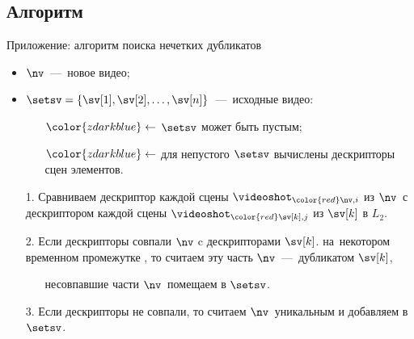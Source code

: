 
\subsection{Алгоритм}

\begin{frame}{Приложение: алгоритм поиска нечетких дубликатов}
    \begin{itemize} \footnotesize
        \item $\nv$\ ---~новое видео;
        \item $\setsv = \{\sv[1], \sv[2], \dots, \sv[n]\}$\ ---~исходные видео:
            \begin{itemize}
                \item[${\color{zdarkblue}\leftarrow}$]
                    {\scriptsize  $\setsv$ может быть пустым};
                \item[${\color{zdarkblue}\leftarrow}$]
                    {\scriptsize для непустого $\setsv$
                        вычислены дескрипторы сцен элементов.}
            \end{itemize}
        \item[1.] Сравниваем дескриптор каждой
            сцены $\videoshot_{\color{red}\nv,i}$ из $\nv$\
            с дескриптором каждой сцены
            $\videoshot_{\color{red}\sv[k],j}$ из $\sv[k]$ в $L_2$.
        \item[2.] Если дескрипторы совпали $\nv$ c дескрипторами $\sv[k]$.
            на~некотором временном промежутке ,
            то считаем эту часть $\nv$\ ---~дубликатом $\sv[k]$,
            \begin{itemize}
                \item[] {\scriptsize несовпавшие
                    части $\nv$\ помещаем в $\setsv$}.
            \end{itemize}
        \item[3.] Если дескрипторы не совпали, то считаем $\nv$\ уникальным и
            добавляем в $\setsv$.
    \end{itemize}
\end{frame}
